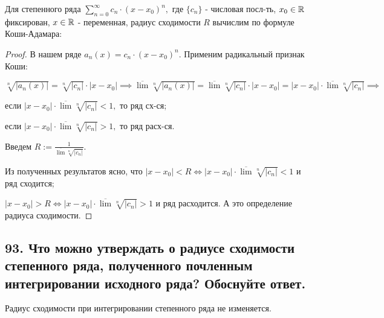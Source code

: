 \documentclass[a4paper, fleqn]{article}
\begin{document}
    Для степенного ряда $\displaystyle \sum_{n = 0}^{\infty} c_n \cdot (x - x_0)^n,$ где $\{ c_n \}$ - числовая посл-ть, $x_0 \in \mathbb{R}$ фиксирован,  $x \in \mathbb{R}$ - переменная, радиус сходимости $R$ вычислим по формуле Коши-Адамара:
    
    
        \begin{proof} 
        В нашем ряде $a_n(x) = c_n \cdot (x - x_0)^n.$ Применим радикальный признак Коши: 
        
        $\sqrt[n]{|a_n(x)|} = \sqrt[n]{|c_n|} \cdot |x - x_0| \implies
        \overline{\lim} \sqrt[n]{|a_n(x)|} = \overline{\lim} \sqrt[n]{|c_n|} \cdot |x - x_0| =
        |x - x_0| \cdot \overline{\lim} \sqrt[n]{|c_n|} \implies $ 
        
        если $|x - x_0| \cdot \overline{\lim} \sqrt[n]{|c_n|} < 1,$ то ряд сх-ся;
        
        если $|x - x_0| \cdot \overline{\lim} \sqrt[n]{|c_n|} > 1,$ то ряд расх-ся.
        
        Введем $R := \frac{1}{\overline{\lim} \sqrt[n]{|c_n|}}.$
        
        Из полученных результатов ясно, что $|x - x_0| < R \iff |x - x_0| \cdot \overline{\lim} \sqrt[n]{|c_n|} < 1$ и ряд сходится; 
        
        $|x - x_0| > R \iff |x - x_0| \cdot \overline{\lim} \sqrt[n]{|c_n|} > 1$ и ряд расходится. А это определение радиуса сходимости.
        
        \end{proof}
        
        
    
        
        
        
    \subsection*{93. Что можно утверждать о радиусе сходимости степенного ряда, полученного почленным интегрировании исходного ряда? Обоснуйте ответ.}

    Радиус сходимости при интегрировании степенного ряда не изменяется.
\end{document}
